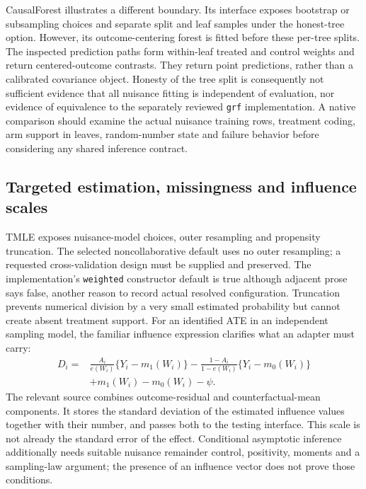 CausalForest illustrates a different boundary. Its interface exposes
bootstrap or subsampling choices and separate split and leaf samples under
the honest-tree option. However, its outcome-centering forest is fitted
before these per-tree splits. The inspected prediction paths form
within-leaf treated and control weights and return centered-outcome
contrasts. They return point predictions, rather than a calibrated covariance
object. Honesty of the tree split is consequently not sufficient evidence
that all nuisance fitting is independent of evaluation, nor evidence of
equivalence to the separately reviewed \texttt{grf} implementation. A native
comparison should examine the actual nuisance training rows, treatment
coding, arm support in leaves, random-number state and failure behavior
before considering any shared inference contract.
\citep{exec21_effects_causalforest}

\subsection{Targeted estimation, missingness and influence scales}
\label{exec21:effects-tmle}

TMLE exposes nuisance-model choices, outer resampling and propensity
truncation. The selected noncollaborative default uses no outer resampling;
a requested cross-validation design must be supplied and preserved. The
implementation's \texttt{weighted} constructor default is true although
adjacent prose says false, another reason to record actual resolved
configuration. Truncation prevents numerical division by a very small
estimated probability but cannot create absent treatment support. For an
identified ATE in an independent sampling model, the familiar influence
expression clarifies what an adapter must carry:
\begin{equation}
\label{exec21:effects-influence}
\begin{aligned}
 D_i={}&\frac{A_i}{e(W_i)}\{Y_i-m_1(W_i)\}
       -\frac{1-A_i}{1-e(W_i)}\{Y_i-m_0(W_i)\}\\
       &+m_1(W_i)-m_0(W_i)-\psi .
\end{aligned}
\end{equation}
The relevant source combines outcome-residual and counterfactual-mean
components. It stores the standard deviation of the estimated influence
values together with their number, and passes both to the testing
interface. This scale is not already the standard error of the effect.
Conditional asymptotic inference additionally needs suitable nuisance
remainder control, positivity, moments and a sampling-law argument; the
presence of an influence vector does not prove those conditions.
\citep{exec21_effects_tmle}

